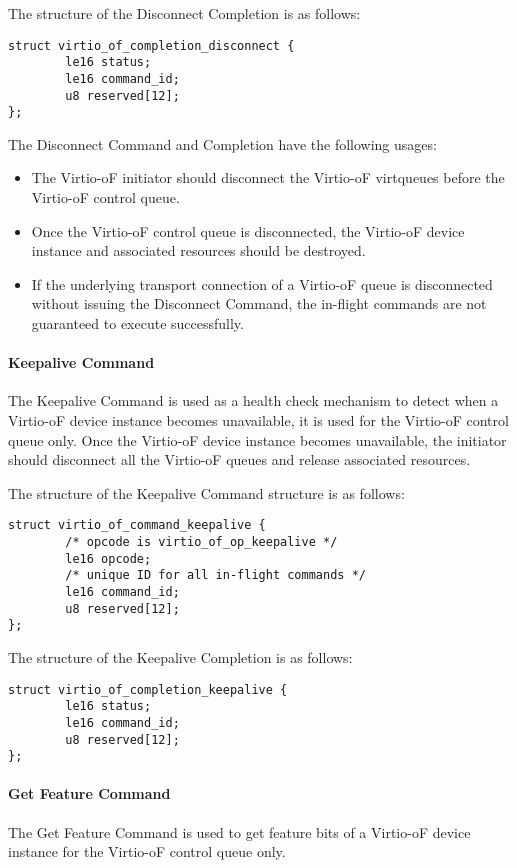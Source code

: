The structure of the Disconnect Completion is as follows:
\begin{lstlisting}
struct virtio_of_completion_disconnect {
        le16 status;
        le16 command_id;
        u8 reserved[12];
};
\end{lstlisting}

The Disconnect Command and Completion have the following usages:
\begin{itemize}
\item The Virtio-oF initiator should disconnect the Virtio-oF virtqueues before the Virtio-oF control queue.
\item Once the Virtio-oF control queue is disconnected, the Virtio-oF device instance and associated resources should be destroyed.
\item If the underlying transport connection of a Virtio-oF queue is disconnected without issuing the Disconnect Command, the in-flight commands are not guaranteed to execute successfully.
\end{itemize}

\paragraph{Keepalive Command}\label{sec:Virtio Transport Options / Virtio Over Fabrics / Commands Definition / Opcodes / Keepalive Command}
The Keepalive Command is used as a health check mechanism to detect when a Virtio-oF device instance becomes unavailable, it is used for the Virtio-oF control queue only.
Once the Virtio-oF device instance becomes unavailable, the initiator should disconnect all the Virtio-oF queues and release associated resources.

The structure of the Keepalive Command structure is as follows:
\begin{lstlisting}
struct virtio_of_command_keepalive {
        /* opcode is virtio_of_op_keepalive */
        le16 opcode;
        /* unique ID for all in-flight commands */
        le16 command_id;
        u8 reserved[12];
};
\end{lstlisting}

The structure of the Keepalive Completion is as follows:
\begin{lstlisting}
struct virtio_of_completion_keepalive {
        le16 status;
        le16 command_id;
        u8 reserved[12];
};
\end{lstlisting}

\paragraph{Get Feature Command}\label{sec:Virtio Transport Options / Virtio Over Fabrics / Commands Definition / Opcodes / Get Feature Command}
The Get Feature Command is used to get feature bits of a Virtio-oF device instance for the Virtio-oF control queue only.

